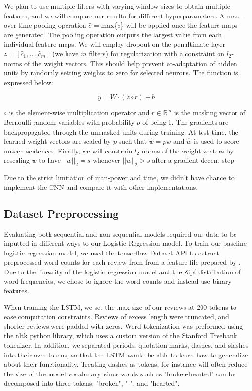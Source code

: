 \documentclass[conference]{IEEEtran}
\begin{document}
    We plan to use multiple filters with varying window sizes to obtain multiple features, and we will
    compare our results for different hyperparameters.
    A max-over-time pooling operation $\hat{c}$ = max\{$c$\} will be applied once the feature
    maps are generated. The pooling operation outputs the largest value from each individual
    feature maps. We will employ dropout on the penultimate layer $z = [\hat{c}_1,...,\hat{c}_m]$
    (we have $m$ filters) for regularization with a constraint on $l_2$-norms of the weight
    vectors. This should help prevent co-adaptation of hidden units by randomly setting weights
    to zero for selected neurons. The function is expressed below:

    \begin{equation}
    y = W \cdot (z \circ r) + b
    \end{equation}

    $\circ$ is the element-wise multiplication operator and $r \in \mathbb{R}^m$ is
    the masking vector of Bernoulli random variables with probability $p$ of being 1.
    The gradients are backpropagated through the unmasked units during training. At test
    time, the learned weight vectors are scaled by $p$ such that $\hat{w} = pw$ and $\hat{w}$
    is used to score unseen sentences. Finally, we will constrain $l_2$-norms of the weight
    vectors by rescaling $w$ to have $||w||_2 = s$ whenever $||w||_2 > s$ after a gradient
    decent step.

    Due to the strict limitation of man-power and time, we didn't have chance to
    implement the CNN and compare it with other implementations.

\subsection{Dataset Preprocessing}
    Evaluating both sequential and non-sequential models required our data to be inputted
    in different ways to our Logistic Regression model. To train our baseline logistic regression
    model, we used the tensorflow Dataset API to extract preprocessed word counts for each
    review from from a feature file prepared by \cite{maas2011learning}. Due to the linearity of
    the logistic regression model and the Zipf distribution of word frequencies, we chose
    to ignore the word counts and instead use binary features.

    When training the LSTM, we set the max size of our reviews at 200 tokens to ease
    computation constraints. Reviews of excess length were truncated, and shorter reviews
    were padded with zeros. Word tokenization was preformed using the nltk python library,
    which uses a custom version of the Stanford Treebank tokenizer. In addition, we separated
    periods, quotation marks, dashes, and slashes into their own tokens, so that the LSTM
    would be able to learn how to generalize about their functionality. Treating dashes as tokens,
    for instance will often reduce the size of the model vocabulary, since words such as
     "broken-hearted" can be decomposed into three tokens: "broken", "-", and "hearted".
\end{document}
